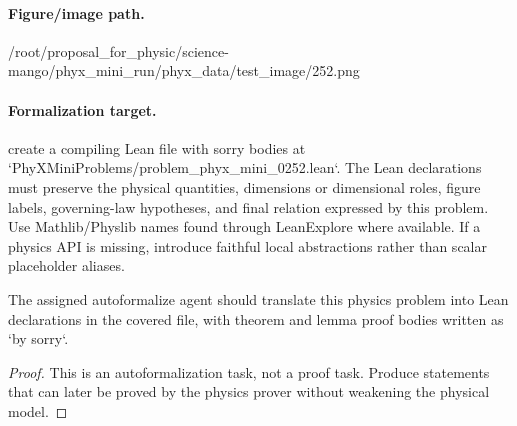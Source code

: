 \paragraph{Figure/image path.}
/root/proposal\_for\_physic/science-mango/phyx\_mini\_run/phyx\_data/test\_image/252.png

\paragraph{Formalization target.}
create a compiling Lean file with sorry bodies at `PhyXMiniProblems/problem\_phyx\_mini\_0252.lean`. The Lean declarations must preserve the physical quantities, dimensions or dimensional roles, figure labels, governing-law hypotheses, and final relation expressed by this problem.
Use Mathlib/Physlib names found through LeanExplore where available. If a physics API is missing, introduce faithful local abstractions rather than scalar placeholder aliases.

\begin{theorem}
\label{thm:physics:phyx_mini_0252:target}
The assigned autoformalize agent should translate this physics problem into Lean declarations in the covered file, with theorem and lemma proof bodies written as `by sorry`.
\end{theorem}
\begin{proof}
This is an autoformalization task, not a proof task. Produce statements that can later be proved by the physics prover without weakening the physical model.
\end{proof}

